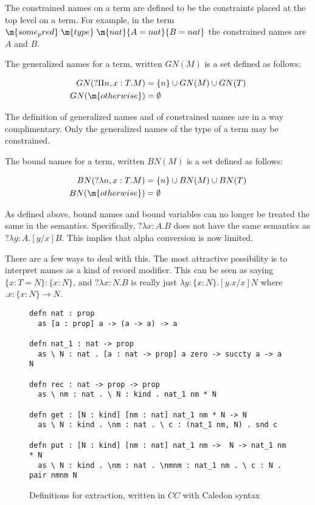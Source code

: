 The constrained names on a term are defined to be the constraints placed at the top level on 
a term.  For example, in the term $\m{some_pred} \; \m{type} \; \m{nat} \{ A = nat \} \{ B = nat \}$ the constrained names are $A$ and $B$.  

\begin{definition}
The generalized names for a term, written $GN(M)$ is a set defined as follows:

\begin{align}
GN(?\Pi n,x : T . M) &= \{ n \} \cup GN(M) \cup GN(T)
\\
GN(\m{otherwise}) &= \emptyset
\end{align}
\end{definition}

The definition of generalized names and of constrained names are in a way complimentary.
Only the generalized names of the type of a term may be constrained.

\begin{definition}
The bound names for a term, written $BN(M)$ is a set defined as follows:

\begin{align} 
BN(?\lambda n,x : T . M) &= \{ n \} \cup BN(M) \cup BN(T)
\\
BN(\m{otherwise}) &= \emptyset
\end{align}

\end{definition}

As defined above, bound names and bound variables can no longer be treated the same in the semantics.  
Specifically, $?\lambda x : A . B$ does not have the same semantics as $?\lambda y : A . [y / x] B$.  
This implies that alpha conversion is now limited.  

There are a few ways to deal with this.  
The most attractive possibility is to interpret names as a kind of record modifier.
This can be seen as saying $\{ x : T = N \} : \{ x : N \}$, 
and $?\lambda x : N . B$ is really just $\lambda y : \{ x : N \} . [ y.x / x ] N$ where $ .x : \{ x : N \} \rightarrow N$.

\begin{figure}[H]
\begin{lstlisting}
defn nat : prop 
  as [a : prop] a -> (a -> a) -> a

defn nat_1 : nat -> prop
  as \ N : nat . [a : nat -> prop] a zero -> succty a -> a N

defn rec : nat -> prop -> prop
  as \ nm : nat . \ N : kind . nat_1 nm * N

defn get : [N : kind] [nm : nat] nat_1 nm * N -> N
  as \ N : kind . \nm : nat . \ c : (nat_1 nm, N) . snd c

defn put : [N : kind] [nm : nat] nat_1 nm ->  N -> nat_1 nm * N
  as \ N : kind . \nm : nat . \nmnm : nat_1 nm . \ c : N . pair nmnm N
\end{lstlisting}
\caption{Definitions for extraction, written in $CC$ with Caledon syntax}
\label{code:ideal}
\end{figure}

